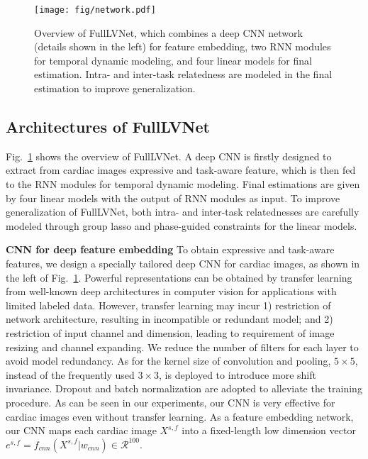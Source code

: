 \documentclass{llncs}
\begin{document}
\begin{figure}[h]
	\centering
	\texttt{[image: fig/network.pdf]}
	\caption{Overview of FullLVNet, which combines a deep CNN network (details shown in the left) for feature embedding, two RNN modules for temporal dynamic modeling, and four linear models for final estimation. Intra- and inter-task relatedness are modeled in the final estimation to improve generalization.}
	\label{fig_network}
\end{figure}

\subsection{Architectures of FullLVNet}
Fig.~\ref{fig_network} shows the overview of FullLVNet. A deep CNN is firstly designed to extract from cardiac images expressive and task-aware feature, which is then fed to the RNN modules for temporal dynamic modeling. Final estimations are given by four linear models with the output of RNN modules as input. To improve generalization of FullLVNet, both intra- and inter-task relatednesses are carefully modeled through group lasso and phase-guided constraints for the linear models.

\textbf{CNN for deep feature embedding}
To obtain expressive and task-aware features, we design a specially tailored deep CNN for cardiac images, as shown in the left of Fig.~\ref{fig_network}. %
Powerful representations can be obtained by transfer learning~\cite{shin2016deep} from well-known deep architectures in computer vision for applications with limited labeled data. However, transfer learning may incur 1) restriction of network architecture, resulting in incompatible or redundant model; and 2) restriction of input channel and dimension, leading to requirement of image resizing and channel expanding. 
We reduce the number of filters for each layer to avoid model redundancy. As for the kernel size of convolution and pooling, $5\times 5$, instead of the frequently used $3\times 3$, is deployed to introduce more shift invariance. Dropout and batch normalization are adopted to alleviate the training procedure. As can be seen in our experiments, our CNN is very effective for cardiac images even without transfer learning. As a feature embedding network, our CNN maps each cardiac image $X^{s,f}$ into a fixed-length low dimension vector $e^{s,f}=f_{cnn}(X^{s,f}|w_{cnn})\in \mathcal{R}^{100}$. 
\end{document}
